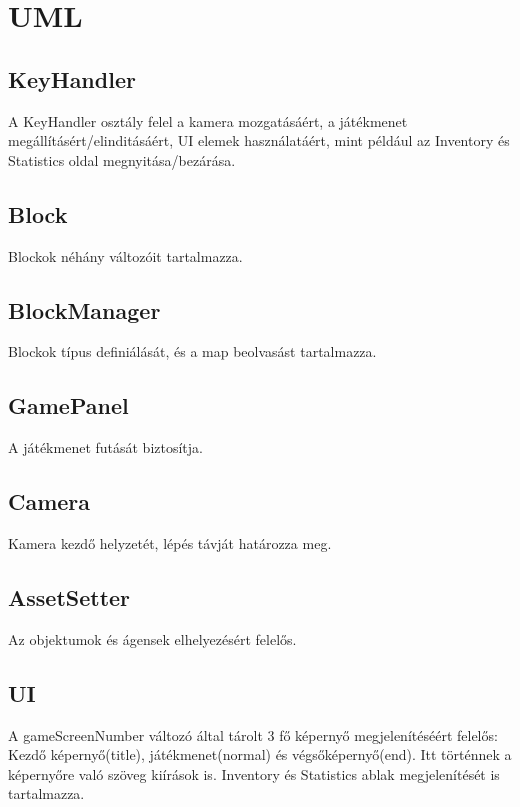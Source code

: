 
\section{UML}

\subsection{KeyHandler}

A KeyHandler osztály felel a kamera mozgatásáért, a játékmenet megállításért/elinditásáért, UI elemek használatáért, 
mint például az Inventory és Statistics oldal megnyitása/bezárása.

\subsection{Block}

Blockok néhány változóit tartalmazza.

\subsection{BlockManager}

Blockok típus definiálását, és a map beolvasást tartalmazza.

\subsection{GamePanel}

A játékmenet futását biztosítja.

\subsection{Camera}

Kamera kezdő helyzetét, lépés távját határozza meg.

\subsection{AssetSetter}

Az objektumok és ágensek elhelyezésért felelős.

\subsection{UI}

A gameScreenNumber változó által tárolt 3 fő képernyő megjelenítéséért felelős: Kezdő képernyő(title),
játékmenet(normal) és végsőképernyő(end).
Itt történnek a képernyőre való szöveg kiírások is.
Inventory és Statistics ablak megjelenítését is tartalmazza.

